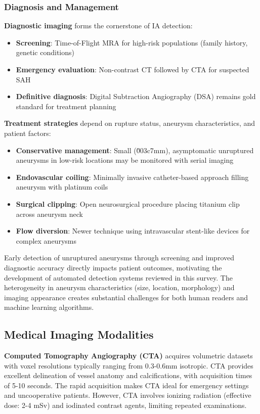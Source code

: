 \documentclass[conference]{IEEEtran}
\begin{document}
\subsubsection{Diagnosis and Management}

\textbf{Diagnostic imaging} forms the cornerstone of IA detection:
\begin{itemize}
    \item \textbf{Screening}: Time-of-Flight MRA for high-risk populations (family history, genetic conditions)
    \item \textbf{Emergency evaluation}: Non-contrast CT followed by CTA for suspected SAH
    \item \textbf{Definitive diagnosis}: Digital Subtraction Angiography (DSA) remains gold standard for treatment planning
\end{itemize}

\textbf{Treatment strategies} depend on rupture status, aneurysm characteristics, and patient factors:
\begin{itemize}
    \item \textbf{Conservative management}: Small (\u003c7mm), asymptomatic unruptured aneurysms in low-risk locations may be monitored with serial imaging
    \item \textbf{Endovascular coiling}: Minimally invasive catheter-based approach filling aneurysm with platinum coils
    \item \textbf{Surgical clipping}: Open neurosurgical procedure placing titanium clip across aneurysm neck
    \item \textbf{Flow diversion}: Newer technique using intravascular stent-like devices for complex aneurysms
\end{itemize}

Early detection of unruptured aneurysms through screening and improved diagnostic accuracy directly impacts patient outcomes, motivating the development of automated detection systems reviewed in this survey. The heterogeneity in aneurysm characteristics (size, location, morphology) and imaging appearance creates substantial challenges for both human readers and machine learning algorithms.

\subsection{Medical Imaging Modalities}

\textbf{Computed Tomography Angiography (CTA)} acquires volumetric datasets with voxel resolutions typically ranging from 0.3-0.6mm isotropic. CTA provides excellent delineation of vessel anatomy and calcifications, with acquisition times of 5-10 seconds. The rapid acquisition makes CTA ideal for emergency settings and uncooperative patients. However, CTA involves ionizing radiation (effective dose: 2-4 mSv) and iodinated contrast agents, limiting repeated examinations.
\end{document}
